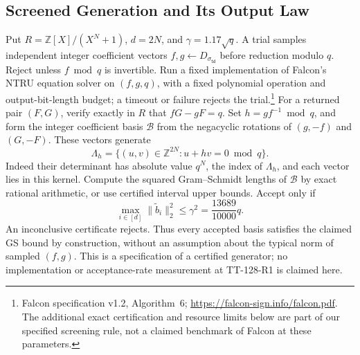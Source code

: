 \documentclass[lettersize,journal]{IEEEtran}
\begin{document}
	\subsection{Screened Generation and Its Output Law}
	\label{par:blue-screened-generation}
	Put $R=\mathbb Z[X]/(X^N+1)$, $d=2N$, and $\gamma=1.17\sqrt q$.
	A trial samples independent integer coefficient vectors
	$f,g\leftarrow D_{\sigma_{\mathsf{td}}}$ before reduction modulo $q$.
	Reject unless $f\bmod q$ is invertible. Run a fixed implementation of
	Falcon's NTRU equation solver on $(f,g,q)$, with a fixed polynomial
	operation and output-bit-length budget; a timeout or failure rejects
	the trial.\footnote{Falcon specification v1.2, Algorithm~6;
		\url{https://falcon-sign.info/falcon.pdf}. The additional exact
		certification and resource limits below are part of our specified
		screening rule, not a claimed benchmark of Falcon at these parameters.}
	For a returned pair $(F,G)$, verify exactly in $R$ that $fG-gF=q$.
	Set $h=gf^{-1}\bmod q$, and form the integer coefficient basis
	$\mathcal B$ from the negacyclic rotations of $(g,-f)$ and $(G,-F)$.
	These vectors generate
	\[
	\Lambda_h=\{(u,v)\in\mathbb Z^{2N}:u+hv=0\bmod q\}.
	\]
	Indeed their determinant has absolute value $q^N$, the index of
	$\Lambda_h$, and each vector lies in this kernel. Compute the squared
	Gram--Schmidt lengths of $\mathcal B$ by exact rational arithmetic,
	or use certified interval upper bounds. Accept only if
	\[
	\max_{i\in[d]}\|\widetilde b_i\|_2^2
	\leq \gamma^2=\frac{13689}{10000}q.
	\]
	An inconclusive certificate rejects. Thus every accepted basis satisfies
	the claimed GS bound by construction, without an assumption about the
	typical norm of sampled $(f,g)$. This is a specification of a certified
	generator; no implementation or acceptance-rate measurement at
	TT-128-R1 is claimed here.
	
\end{document}
